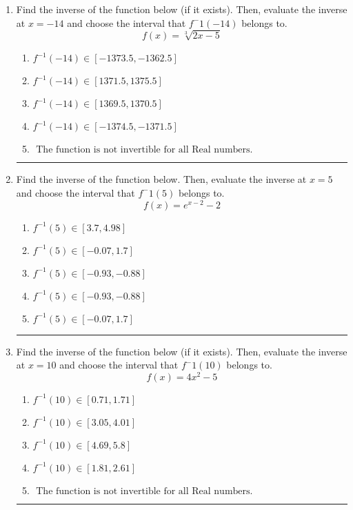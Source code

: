 \documentclass[14pt]{extbook}
\newcommand{\litem}[1]{\item#1\hspace*{-1cm}\rule{\textwidth}{0.4pt}}
\begin{document}
\begin{enumerate}
{\begin{enumerate}[label=\Alph*.]
\end{enumerate} }
\litem{
Find the inverse of the function below (if it exists). Then, evaluate the inverse at $x = -14$ and choose the interval that $f^-1(-14)$ belongs to.\[ f(x) = \sqrt[3]{2 x - 5} \]\begin{enumerate}[label=\Alph*.]
\item \( f^{-1}(-14) \in [-1373.5, -1362.5] \)
\item \( f^{-1}(-14) \in [1371.5, 1375.5] \)
\item \( f^{-1}(-14) \in [1369.5, 1370.5] \)
\item \( f^{-1}(-14) \in [-1374.5, -1371.5] \)
\item \( \text{ The function is not invertible for all Real numbers. } \)

\end{enumerate} }
\litem{
Find the inverse of the function below. Then, evaluate the inverse at $x = 5$ and choose the interval that $f^-1(5)$ belongs to.\[ f(x) = e^{x-2}-2 \]\begin{enumerate}[label=\Alph*.]
\item \( f^{-1}(5) \in [3.7, 4.98] \)
\item \( f^{-1}(5) \in [-0.07, 1.7] \)
\item \( f^{-1}(5) \in [-0.93, -0.88] \)
\item \( f^{-1}(5) \in [-0.93, -0.88] \)
\item \( f^{-1}(5) \in [-0.07, 1.7] \)

\end{enumerate} }
\litem{
Find the inverse of the function below (if it exists). Then, evaluate the inverse at $x = 10$ and choose the interval that $f^-1(10)$ belongs to.\[ f(x) = 4 x^2 - 5 \]\begin{enumerate}[label=\Alph*.]
\item \( f^{-1}(10) \in [0.71, 1.71] \)
\item \( f^{-1}(10) \in [3.05, 4.01] \)
\item \( f^{-1}(10) \in [4.69, 5.8] \)
\item \( f^{-1}(10) \in [1.81, 2.61] \)
\item \( \text{ The function is not invertible for all Real numbers. } \)


\end{enumerate}}
\end{enumerate}
\end{document}
